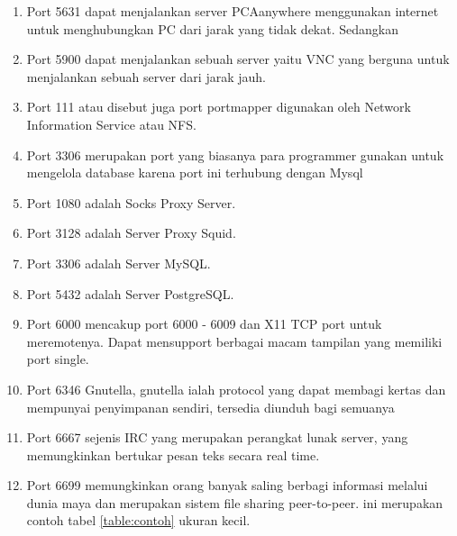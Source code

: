\begin{enumerate}
\item Port 5631 dapat menjalankan server PCAanywhere menggunakan internet untuk menghubungkan PC dari jarak yang tidak dekat.
Sedangkan 
\item Port 5900 dapat menjalankan sebuah server yaitu VNC yang berguna untuk menjalankan sebuah server dari jarak jauh.
\item Port 111 atau disebut juga port portmapper digunakan oleh Network Information Service atau NFS.
\item Port 3306 merupakan port yang biasanya para programmer gunakan untuk mengelola database karena port ini terhubung dengan Mysql
\item Port 1080 adalah Socks Proxy Server.
\item Port 3128 adalah Server Proxy Squid.
\item Port 3306 adalah Server MySQL.
\item Port 5432 adalah Server PostgreSQL.
\item Port 6000 mencakup port 6000 - 6009 dan X11 TCP port untuk meremotenya. Dapat mensupport berbagai macam tampilan yang memiliki port single.
\item Port 6346 Gnutella, gnutella ialah protocol yang dapat membagi kertas dan mempunyai penyimpanan sendiri, tersedia diunduh bagi semuanya
\item Port 6667 sejenis IRC yang merupakan perangkat lunak server, yang memungkinkan bertukar pesan teks secara real time.
\item Port 6699 memungkinkan orang banyak saling berbagi informasi melalui dunia maya dan  merupakan sistem file sharing peer-to-peer.
ini merupakan contoh tabel \ref{table:contoh} ukuran kecil.


\end{enumerate}